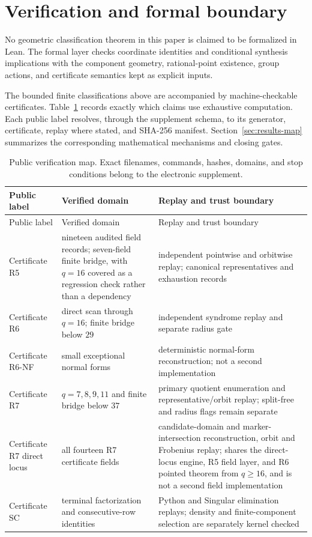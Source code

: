 \section{Verification and formal boundary}\label{sec:verification}

No geometric classification theorem in this paper is claimed to be
formalized in Lean.  The formal layer checks coordinate identities and
conditional synthesis implications with the component geometry,
rational-point existence, group actions, and certificate semantics
kept as explicit inputs.

The bounded finite classifications above are accompanied by machine-checkable
certificates.  Table~\ref{tab:evidence} records exactly which claims use
exhaustive computation.  Each public label resolves, through the supplement
schema, to its generator, certificate, replay where stated, and
SHA-256 manifest.  Section~\ref{sec:results-map} summarizes the corresponding
mathematical mechanisms and closing gates.

\small
\begin{longtable}{>{\raggedright\arraybackslash}p{}
                  >{\raggedright\arraybackslash}p{}
                  >{\raggedright\arraybackslash}p{}}
\caption{Public verification map.  Exact filenames, commands, hashes,
domains, and stop conditions belong to the electronic supplement.}
\label{tab:evidence}\\
\toprule
Public label & Verified domain & Replay and trust boundary\\
\midrule
\endfirsthead
\toprule
Public label & Verified domain & Replay and trust boundary\\
\midrule
\endhead
\bottomrule
\endfoot
Certificate R5 & nineteen audited field records; seven-field finite
bridge, with \(q=16\) covered as a regression check rather than a
dependency & independent pointwise and orbitwise replay;
canonical representatives and exhaustion records\\
Certificate R6 & direct scan through $q=16$; finite bridge below $29$ &
independent syndrome replay and separate radius gate\\
Certificate R6-NF & small exceptional normal forms & deterministic
normal-form reconstruction; not a second implementation\\
Certificate R7 & $q=7,8,9,11$ and finite bridge below $37$ &
primary quotient enumeration and representative/orbit replay;
split-free and radius flags remain separate\\
Certificate R7 direct locus & all fourteen R7 certificate fields &
candidate-domain and marker-intersection reconstruction, orbit and
Frobenius replay; shares the direct-locus engine, R5 field layer, and
R6 pointed theorem from \(q\geq16\), and is not a second field
implementation\\
Certificate SC & terminal factorization and consecutive-row identities &
Python and Singular elimination replays; density and finite-component
selection are separately kernel checked\\
\end{longtable}
\normalsize

